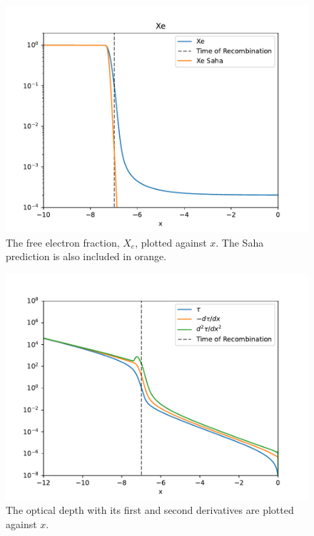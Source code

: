 \documentclass{aa}
\begin{document}
\begin{figure}[H]
   \includegraphics[scale=0.5]{../figures/milestone2/X_e.pdf}
   \caption{The free electron fraction, $X_e$, plotted against $x$. The Saha prediction is also included in orange.}\label{fig:M2:X_e}
\end{figure}

\begin{figure}[H]
   \includegraphics[scale=0.5]{../figures/milestone2/taus.pdf}
   \caption{The optical depth with its first and second derivatives are plotted against $x$.}\label{fig:M2:taus}
\end{figure}
\end{document}
